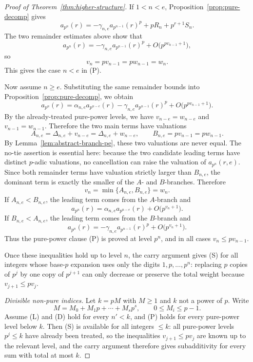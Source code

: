 \documentclass[11pt]{amsart}
\numberwithin{equation}{section}
\newcommand{\bigo}{O}
\begin{document}
\begin{proof}[Proof of Theorem~\ref{thm:higher-structure}]
If $1<n<e$, Proposition~\ref{prop:pure-decomp} gives
\[
        a_{p^n}(r)=-\gamma_{n,e}a_{p^{n-1}}(r)^p+pR_n+p^{r+1}S_n.
\]
The two remainder estimates above show that
\[
        a_{p^n}(r)=-\gamma_{n,e}a_{p^{n-1}}(r)^p+\bigo\bigl(p^{p v_{n-1}+1}\bigr),
\]
so
\[
        v_n=p v_{n-1}=p w_{n-1}=w_n.
\]
This gives the case $n<e$ in (P).

Now assume $n\ge e$.  Substituting the same remainder bounds into Proposition~\ref{prop:pure-decomp}, we obtain
\[
        a_{p^n}(r)=\alpha_{n,e}a_{p^{n-e}}(r)-\gamma_{n,e}a_{p^{n-1}}(r)^p+\bigo\bigl(p^{p v_{n-1}+1}\bigr).
\]
By the already-treated pure-power levels, we have $v_{n-e}=w_{n-e}$ and $v_{n-1}=w_{n-1}$.  Therefore the two main terms have valuations
\[
        A_{n,e}=\Delta_{n,e}+v_{n-e}=\Delta_{n,e}+w_{n-e},
        \qquad
        B_{n,e}=p v_{n-1}=p w_{n-1}.
\]
By Lemma~\ref{lem:abstract-branch-pe}, these two valuations are never equal.  The no-tie assertion is essential here: because the two candidate leading terms have distinct $p$-adic valuations, no cancellation can raise the valuation of $a_{p^n}(r,e)$.  Since both remainder terms have valuation strictly larger than $B_{n,e}$, the dominant term is exactly the smaller of the $A$- and $B$-branches.  Therefore
\[
        v_n=\min\{A_{n,e},B_{n,e}\}=w_n.
\]
If $A_{n,e}<B_{n,e}$, the leading term comes from the $A$-branch and
\[
        a_{p^n}(r)=\alpha_{n,e}a_{p^{n-e}}(r)+\bigo\bigl(p^{v_n+1}\bigr).
\]
If $B_{n,e}<A_{n,e}$, the leading term comes from the $B$-branch and
\[
        a_{p^n}(r)=-\gamma_{n,e}a_{p^{n-1}}(r)^p+\bigo\bigl(p^{v_n+1}\bigr).
\]
Thus the pure-power clause (P) is proved at level $p^n$, and in all cases $v_n\le p v_{n-1}$.

Once these inequalities hold up to level $n$, the carry argument gives (S) for all integers whose base-$p$ expansion uses only the digits $1,p,\ldots,p^n$: replacing $p$ copies of $p^j$ by one copy of $p^{j+1}$ can only decrease or preserve the total weight because $v_{j+1}\le p v_j$.

\smallskip
\noindent\emph{Divisible non-pure indices.}
Let $k=pM$ with $M\ge1$ and $k$ not a power of $p$.  Write
\[
        M=M_0+M_1p+\cdots+M_sp^s,
        \qquad
        0\le M_i\le p-1.
\]
Assume (L) and (D) hold for every $n'<k$, and (P) holds for every pure-power level below $k$.  Then (S) is available for all integers $\le k$: all pure-power levels $p^j\le k$ have already been treated, so the inequalities $v_{j+1}\le p v_j$ are known up to the relevant level, and the carry argument therefore gives subadditivity for every sum with total at most $k$.


\end{proof}
\end{document}
